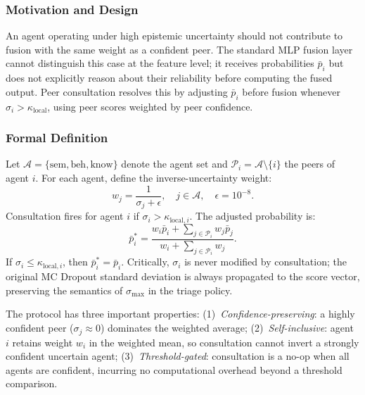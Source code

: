 \subsubsection{Motivation and Design}

An agent operating under high epistemic uncertainty should not contribute to fusion with the same weight as a confident peer. The standard MLP fusion layer cannot distinguish this case at the feature level; it receives probabilities $\bar{p}_i$ but does not explicitly reason about their reliability before computing the fused output. Peer consultation resolves this by adjusting $\bar{p}_i$ before fusion whenever $\sigma_i > \kappa_\text{local}$, using peer scores weighted by peer confidence.

\subsubsection{Formal Definition}

Let $\mathcal{A} = \{\text{sem}, \text{beh}, \text{know}\}$ denote the agent set and $\mathcal{P}_i = \mathcal{A} \setminus \{i\}$ the peers of agent $i$. For each agent, define the inverse-uncertainty weight:
\begin{equation}
w_j = \frac{1}{\sigma_j + \epsilon}, \quad j \in \mathcal{A}, \quad \epsilon = 10^{-8}.
\label{eq:tifs_weights}
\end{equation}
Consultation fires for agent $i$ if $\sigma_i > \kappa_{\text{local},i}$. The adjusted probability is:
\begin{equation}
\bar{p}_i^* = \frac{w_i \bar{p}_i + \sum_{j \in \mathcal{P}_i} w_j \bar{p}_j}{w_i + \sum_{j \in \mathcal{P}_i} w_j}.
\label{eq:tifs_consultation}
\end{equation}
If $\sigma_i \leq \kappa_{\text{local},i}$, then $\bar{p}_i^* = \bar{p}_i$. Critically, $\sigma_i$ is never modified by consultation; the original MC Dropout standard deviation is always propagated to the score vector, preserving the semantics of $\sigma_\text{max}$ in the triage policy.

The protocol has three important properties: (1)~\emph{Confidence-preserving}: a highly confident peer ($\sigma_j \approx 0$) dominates the weighted average; (2)~\emph{Self-inclusive}: agent $i$ retains weight $w_i$ in the weighted mean, so consultation cannot invert a strongly confident uncertain agent; (3)~\emph{Threshold-gated}: consultation is a no-op when all agents are confident, incurring no computational overhead beyond a threshold comparison.

